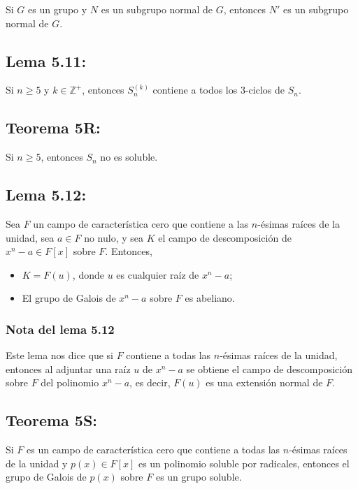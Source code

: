 \documentclass{article}
\begin{document}
Si $G$ es un grupo y $N$ es un subgrupo normal de $G$, entonces $N'$ es un subgrupo normal de $G$.

\subsection*{\color{blue} Lema 5.11:}

Si $n\geq 5$ y $k\in\mathbb{Z}^+$, entonces $S_n^{(k)}$ contiene a todos los $3$-ciclos de $S_n$.

\subsection*{\color{red} Teorema 5R:}

Si $n\geq 5$, entonces $S_n$ no es soluble.

\subsection*{\color{blue} Lema 5.12:}

Sea $F$ un campo de característica cero que contiene a las $n$-ésimas raíces de la unidad, sea $a\in F$ no nulo, y sea $K$ el campo de descomposición de $x^n-a\in F[x]$ sobre $F$. Entonces,

\begin{itemize}
\item $K=F(u)$, donde $u$ es cualquier raíz de $x^n-a$;

\item El grupo de Galois de $x^n-a$ sobre $F$ es abeliano.
\end{itemize}

\subsubsection*{\color{teal} Nota del lema 5.12}

Este lema nos dice que si $F$ contiene a todas las $n$-ésimas raíces de la unidad, entonces al adjuntar una raíz $u$ de $x^n-a$ se obtiene el campo de descomposición sobre $F$ del polinomio $x^n-a$, es decir, $F(u)$ es una extensión normal de $F$.

\subsection*{\color{red} Teorema 5S:}

Si $F$ es un campo de característica cero que contiene a todas las $n$-ésimas raíces de la unidad y $p(x)\in F[x]$ es un polinomio soluble por radicales, entonces el grupo de Galois de $p(x)$ sobre $F$ es un grupo soluble.
\end{document}
